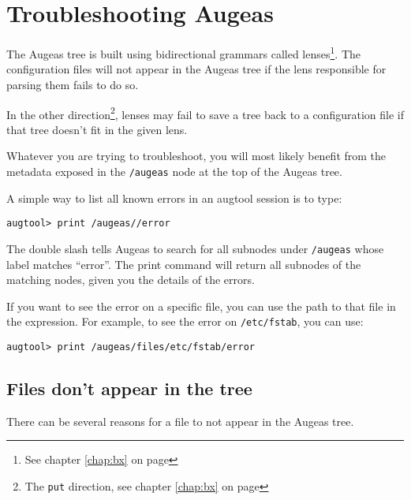 \chapter{Troubleshooting Augeas}

\label{chap:troubleshooting} 

The Augeas tree is built using bidirectional grammars called lenses\footnote{See chapter \ref{chap:bx} on page \pageref{chap:bx}}. The configuration files will not appear in the Augeas tree if the lens responsible for parsing them fails to do so.

In the other direction\footnote{The \verb!put! direction, see chapter \ref{chap:bx} on page \pageref{chap:bx}}, lenses may fail to save a tree back to a configuration file if that tree doesn't fit in the given lens.

Whatever you are trying to troubleshoot, you will most likely benefit from the metadata exposed in the \verb!/augeas! node at the top of the Augeas tree.

A simple way to list all known errors in an augtool session is to type:

 

\begin{verbatim}
augtool> print /augeas//error
\end{verbatim}

The double slash tells Augeas to search for all subnodes under \verb!/augeas! whose label matches ``error''. The print command will return all subnodes of the matching nodes, given you the details of the errors.

If you want to see the error on a specific file, you can use the path to that file in the expression. For example, to see the error on \verb!/etc/fstab!, you can use:

 

\begin{verbatim}
augtool> print /augeas/files/etc/fstab/error
\end{verbatim}

\section{Files don't appear in the tree}

There can be several reasons for a file to not appear in the Augeas tree.

